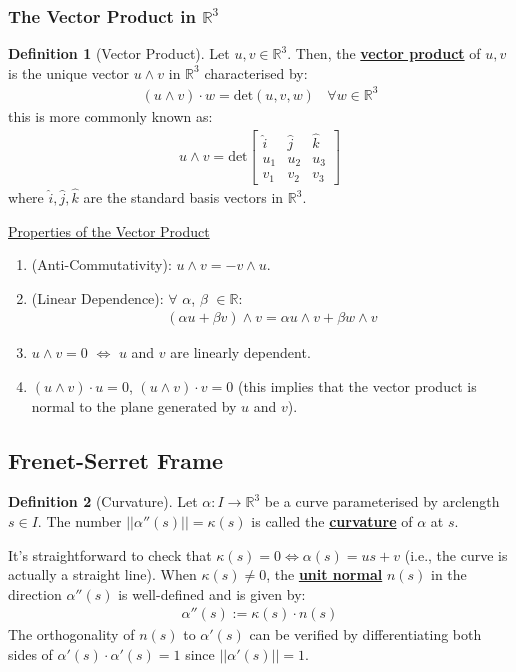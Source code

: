 \documentclass[11pt]{scrartcl}
\newcommand{\R}[0]{\mathbb{R}}
\theoremstyle{definition}
\newtheorem{definition}{Definition}
\theoremstyle{remark}
\newcommand{\dfn}[1]{\textbf{\underline{#1}}}
\begin{document}
{\subsubsection{The Vector Product in $\R^3$}

\begin{definition}[Vector Product]
	Let $u,v \in \R^3$. Then, the \dfn{vector product} of $u,v$ is the unique vector $u \wedge v$ in $\R^3$ characterised by: 
	\begin{align*}
		(u \wedge v) \cdot w = \text{det}(u,v,w)\ \text{  } \forall w \in \R^3
	\end{align*}
	this is more commonly known as:
	\begin{align*}
		u \wedge v = \text{det} \begin{bmatrix}
			\hat{i} & \hat{j} & \hat{k} \\
			u_1 & u_2 & u_3 \\
			v_1 & v_2 & v_3 
		\end{bmatrix}
	\end{align*}
	where $\hat{i}, \hat{j}, \hat{k}$ are the standard basis vectors in $\R^3$. 
\end{definition}

\underline{Properties of the Vector Product} 
\begin{enumerate}[noitemsep]
	\item (Anti-Commutativity): $u \wedge v = -v \wedge u$. 
	\item (Linear Dependence): $\forall$ $\alpha$, $\beta$ $\in \R$: 
	\begin{align*}
		(\alpha u + \beta v) \wedge v = \alpha u \wedge v + \beta w \wedge v
	\end{align*}
	\item $u \wedge v = 0$ $\iff$ $u$ and $v$ are linearly dependent. 
	\item $(u \wedge v) \cdot u =0$, $(u \wedge v) \cdot v =0$ (this implies that the vector product is normal to the plane generated by $u$ and $v$). 
\end{enumerate}

\subsection{Frenet-Serret Frame} %

\begin{definition}[Curvature]
	Let $\alpha: I \rightarrow \R^3$ be a curve parameterised by arclength $s \in I$. The number $|| \alpha''(s) || = \kappa (s)$ is called the \dfn{curvature} of $\alpha$ at $s$. 
\end{definition}
It's straightforward to check that $\kappa(s) = 0 \iff \alpha(s) = us + v$ (i.e., the curve is actually a straight line). When $\kappa(s) \neq 0$, the \dfn{unit normal} $n(s)$ in the direction $\alpha''(s)$ is well-defined and is given by: 
\begin{align*}
	\alpha''(s) := \kappa(s) \cdot n(s)
\end{align*}
The orthogonality of $n(s)$ to $\alpha'(s)$ can be verified by differentiating both sides of $\alpha'(s) \cdot \alpha'(s) = 1$ since $||\alpha'(s)|| =1$. 

}
\end{document}
